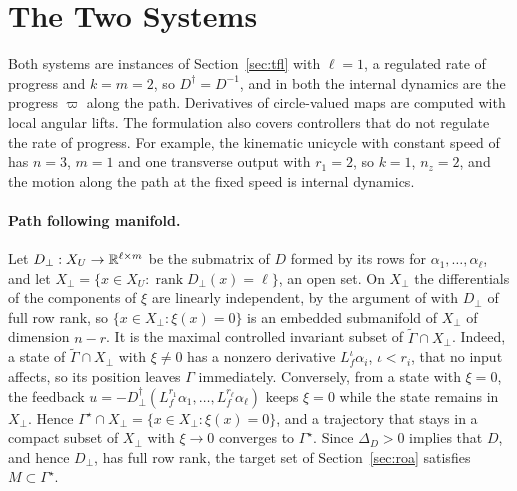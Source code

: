 \section{The Two Systems}\label{app:systems}

Both systems are instances of Section~\ref{sec:tfl} with $\ell=1$, a regulated rate of progress and $k=m=2$, so $D^\dagger=D^{-1}$, and in both the internal dynamics are the progress $\varpi$ along the path. Derivatives of circle-valued maps are computed with local angular lifts. The formulation also covers controllers that do not regulate the rate of progress. For example, the kinematic unicycle with constant speed of \citet{nielsen2006} has $n=3$, $m=1$ and one transverse output with $r_1=2$, so $k=1$, $n_z=2$, and the motion along the path at the fixed speed is internal dynamics.

\paragraph{Path following manifold.} Let $D_\perp:X_U\to\mathbb{R}^{\ell\times m}$ be the submatrix of $D$ formed by its rows for $\alpha_1,\dots,\alpha_\ell$, and let $X_\perp=\{x\in X_U:\operatorname{rank}D_\perp(x)=\ell\}$, an open set. On $X_\perp$ the differentials of the components of $\xi$ are linearly independent, by the argument of \citet[Section~5.1]{isidori1995} with $D_\perp$ of full row rank, so $\{x\in X_\perp:\xi(x)=0\}$ is an embedded submanifold of $X_\perp$ of dimension $n-r$. It is the maximal controlled invariant subset of $\tilde\Gamma\cap X_\perp$. Indeed, a state of $\tilde\Gamma\cap X_\perp$ with $\xi\ne0$ has a nonzero derivative $L_f^\iota\alpha_i$, $\iota<r_i$, that no input affects, so its position leaves $\Gamma$ immediately. Conversely, from a state with $\xi=0$, the feedback $u=-D_\perp^\dagger(L_f^{r_1}\alpha_1,\dots,L_f^{r_\ell}\alpha_\ell)$ keeps $\xi=0$ while the state remains in $X_\perp$. Hence $\Gamma^\star\cap X_\perp=\{x\in X_\perp:\xi(x)=0\}$, and a trajectory that stays in a compact subset of $X_\perp$ with $\xi\to0$ converges to $\Gamma^\star$. Since $\Delta_D>0$ implies that $D$, and hence $D_\perp$, has full row rank, the target set of Section~\ref{sec:roa} satisfies $M\subset\Gamma^\star$.

